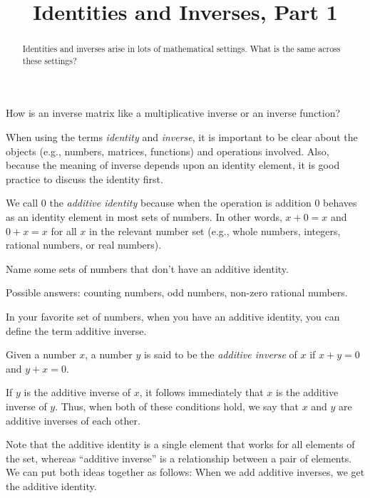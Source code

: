 \documentclass[space,handout,nooutcomes]{ximera}
\title{Identities and Inverses, Part 1}
\begin{document}
\begin{abstract}
Identities and inverses arise in lots of mathematical
settings.  What is the same across these settings?  
\end{abstract}
\maketitle


How is an inverse matrix like a multiplicative inverse or an inverse function?  

When using the terms \emph{identity} and \emph{inverse}, it is
important to be clear about the objects (e.g., numbers, matrices,
functions) and operations involved.  Also, because the meaning of
inverse depends upon an identity element, it is good practice to
discuss the identity first.

\begin{definition}
We call $0$ the \emph{additive identity} because when the operation is addition 
$0$ behaves as an identity element in most sets of numbers.  
In other words, $x+0=x$ and $0+x=x$ for all $x$ in the relevant number
set (e.g., whole numbers, integers, rational numbers, or real
numbers).
\end{definition}

\begin{question}
Name some sets of numbers that don't have an additive identity.
\begin{freeResponse}
Possible answers: counting numbers, odd numbers, non-zero rational
numbers.
\end{freeResponse}
\end{question}

In your favorite set of numbers, when you have an additive identity,
you can define the term additive inverse.  

\begin{definition}
Given a number $x$, a number $y$ is said to be the \emph{additive
  inverse} of $x$ if $x+y=0$ and $y+x=0$.  
\end{definition}

If $y$ is the additive inverse of $x$, it follows immediately that
$x$ is the additive inverse of $y$.  Thus, when both of these
conditions hold, we say that $x$ and $y$ are additive inverses of each
other.

Note that the additive identity is a single element that works for
all elements of the set, whereas ``additive inverse'' is a
relationship between a pair of elements.  We can put both ideas
together as follows: When we add additive inverses, we get the
additive identity.
\end{document}
